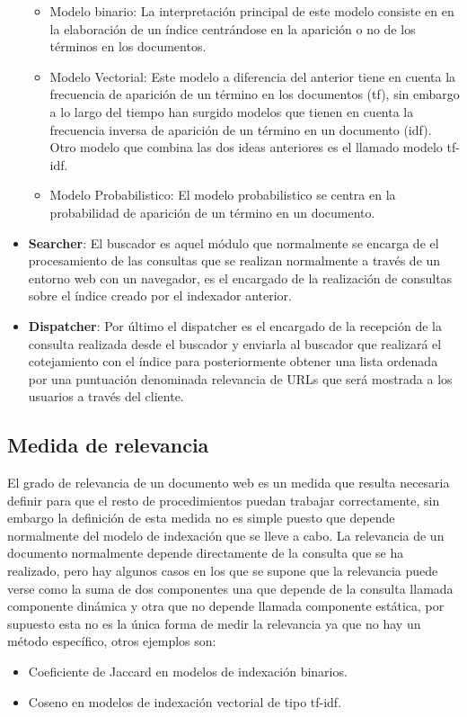 \documentclass[a4paper, 11pt]{article} %
\begin{document}
\begin{itemize}
				\begin{itemize}
					\item Modelo binario: La interpretación principal de este modelo consiste en en la elaboración de un índice centrándose en la aparición o no de los términos en los documentos.
					\item Modelo Vectorial: Este modelo a diferencia del anterior tiene en cuenta la frecuencia de aparición de un término en los documentos (tf), sin embargo a lo largo del tiempo han surgido modelos que tienen en cuenta la frecuencia inversa de aparición de un término en un documento (idf). Otro modelo que combina las dos ideas anteriores es el llamado modelo tf-idf.
					\item Modelo Probabilistico: El modelo probabilistico se centra en la probabilidad de aparición de un término en un documento.
				\end{itemize}
			\item \textbf{Searcher}: El buscador es aquel módulo que normalmente se encarga de el procesamiento de las consultas que se realizan normalmente a través de un entorno web con un navegador, es el encargado de la realización de consultas sobre el índice creado por el indexador anterior.
			\item \textbf{Dispatcher}: Por último el dispatcher es el encargado de la recepción de la consulta realizada desde el buscador y enviarla al buscador que realizará el cotejamiento con el índice para posteriormente obtener una lista ordenada por una puntuación denominada relevancia de URLs que será mostrada a los usuarios a través del cliente.
		\end{itemize}

		\subsection{Medida de relevancia}
		El grado de relevancia de un documento web es un medida que resulta necesaria definir para que el resto de procedimientos puedan trabajar correctamente, sin embargo la definición de esta medida no es simple puesto que depende normalmente del modelo de indexación que se lleve a cabo. La relevancia de un documento normalmente depende directamente de la consulta que se ha realizado, pero hay algunos casos en los que se supone que la relevancia puede verse como la suma de dos componentes una que depende de la consulta llamada componente dinámica y otra que no depende llamada componente estática, por supuesto esta no es la única forma de medir la relevancia ya que no hay un método específico, otros ejemplos son:
		\begin{itemize}
			\item Coeficiente de Jaccard en modelos de indexación binarios.
			\item Coseno en modelos de indexación vectorial de tipo tf-idf.
		\end{itemize}
\end{document}
